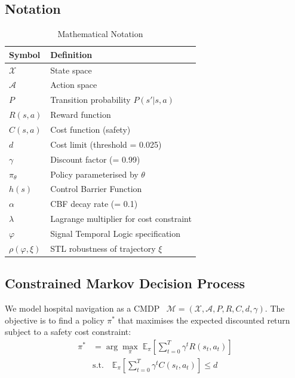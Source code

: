 \documentclass[10pt,twocolumn]{article}
\begin{document}
\subsection{Notation}
\begin{table}[h]
\centering
\caption{Mathematical Notation}
\label{tab:notation}
\begin{tabular}{@{}ll@{}}
\toprule
\textbf{Symbol} & \textbf{Definition} \\
\midrule
$\mathcal{X}$   & State space \\
$\mathcal{A}$   & Action space \\
$P$             & Transition probability $P(s'|s,a)$ \\
$R(s,a)$        & Reward function \\
$C(s,a)$        & Cost function (safety) \\
$d$             & Cost limit (threshold = 0.025) \\
$\gamma$        & Discount factor (= 0.99) \\
$\pi_\theta$    & Policy parameterised by $\theta$ \\
$h(s)$          & Control Barrier Function \\
$\alpha$        & CBF decay rate (= 0.1) \\
$\lambda$       & Lagrange multiplier for cost constraint \\
$\varphi$       & Signal Temporal Logic specification \\
$\rho(\varphi, \xi)$ & STL robustness of trajectory $\xi$ \\
\bottomrule
\end{tabular}
\end{table}

\subsection{Constrained Markov Decision Process}
We model hospital navigation as a CMDP~\cite{altman1999cmdp} $\mathcal{M} = (\mathcal{X}, \mathcal{A}, P, R, C, d, \gamma)$.
The objective is to find a policy $\pi^*$ that maximises the expected discounted return subject to a safety cost constraint:
\begin{equation}
\label{eq:cmdp}
\begin{aligned}
\pi^* &= \arg\max_{\pi} \; \mathbb{E}_\pi \!\left[\sum_{t=0}^{T} \gamma^t R(s_t, a_t)\right] \\
&\text{s.t.} \quad \mathbb{E}_\pi \!\left[\sum_{t=0}^{T} \gamma^t C(s_t, a_t)\right] \leq d
\end{aligned}
\end{equation}
\end{document}
